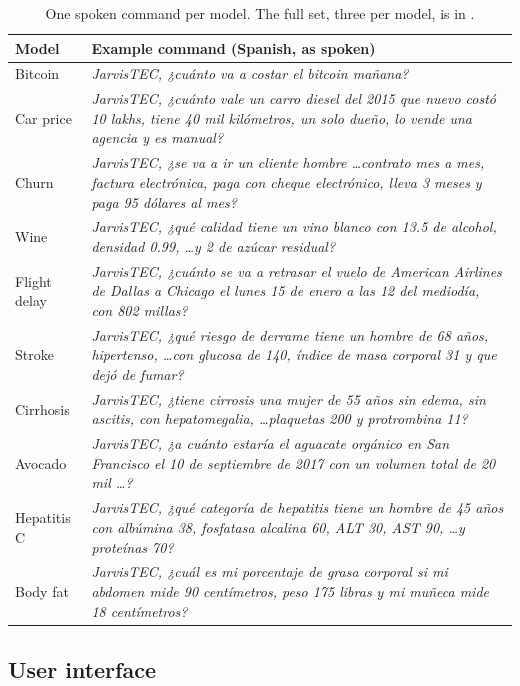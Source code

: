\begin{table}[htbp]
  \centering
  \small
  \begin{tabularx}{\textwidth}{@{}lL@{}}
    \toprule
    Model & Example command (Spanish, as spoken) \\
    \midrule
    Bitcoin & \emph{JarvisTEC, ¿cuánto va a costar el bitcoin mañana?} \\
    Car price & \emph{JarvisTEC, ¿cuánto vale un carro diesel del 2015 que nuevo costó 10 lakhs, tiene 40 mil kilómetros, un solo dueño, lo vende una agencia y es manual?} \\
    Churn & \emph{JarvisTEC, ¿se va a ir un cliente hombre \ldots contrato mes a mes, factura electrónica, paga con cheque electrónico, lleva 3 meses y paga 95 dólares al mes?} \\
    Wine & \emph{JarvisTEC, ¿qué calidad tiene un vino blanco con 13.5 de alcohol, densidad 0.99, \ldots y 2 de azúcar residual?} \\
    Flight delay & \emph{JarvisTEC, ¿cuánto se va a retrasar el vuelo de American Airlines de Dallas a Chicago el lunes 15 de enero a las 12 del mediodía, con 802 millas?} \\
    Stroke & \emph{JarvisTEC, ¿qué riesgo de derrame tiene un hombre de 68 años, hipertenso, \ldots con glucosa de 140, índice de masa corporal 31 y que dejó de fumar?} \\
    Cirrhosis & \emph{JarvisTEC, ¿tiene cirrosis una mujer de 55 años sin edema, sin ascitis, con hepatomegalia, \ldots plaquetas 200 y protrombina 11?} \\
    Avocado & \emph{JarvisTEC, ¿a cuánto estaría el aguacate orgánico en San Francisco el 10 de septiembre de 2017 con un volumen total de 20 mil \ldots?} \\
    Hepatitis C & \emph{JarvisTEC, ¿qué categoría de hepatitis tiene un hombre de 45 años con albúmina 38, fosfatasa alcalina 60, ALT 30, AST 90, \ldots y proteínas 70?} \\
    Body fat & \emph{JarvisTEC, ¿cuál es mi porcentaje de grasa corporal si mi abdomen mide 90 centímetros, peso 175 libras y mi muñeca mide 18 centímetros?} \\
    \bottomrule
  \end{tabularx}
  \caption{One spoken command per model. The full set, three per model, is in .}
  \label{tab:commands}
\end{table}

\subsection{User interface}

